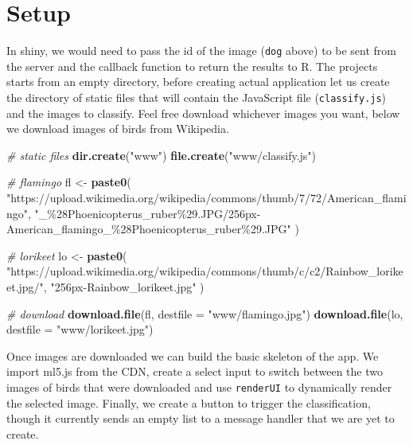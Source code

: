 \documentclass[
]{krantz}
\makeatletter
\newenvironment{Shaded}{\begin{snugshade}}{\end{snugshade}}
\newcommand{\CommentTok}[1]{\textcolor[rgb]{0.37,0.37,0.37}{\textit{#1}}}
\newcommand{\DataTypeTok}[1]{\textcolor[rgb]{0.27,0.27,0.27}{#1}}
\newcommand{\KeywordTok}[1]{\textcolor[rgb]{0.27,0.27,0.27}{\textbf{#1}}}
\newcommand{\NormalTok}[1]{#1}
\newcommand{\StringTok}[1]{\textcolor[rgb]{0.5,0.5,0.5}{#1}}
\newenvironment{kframe}{%
\medskip{}
\setlength{\fboxsep}{.8em}
 \def\at@end@of@kframe{}%
 \ifinner\ifhmode%
  \def\at@end@of@kframe{\end{minipage}}%
  \begin{minipage}{\columnwidth}%
 \fi\fi%
 \def\FrameCommand##1{\hskip\@totalleftmargin \hskip-\fboxsep
 \colorbox{shadecolor}{##1}\hskip-\fboxsep
     \hskip-\linewidth \hskip-\@totalleftmargin \hskip\columnwidth}%
 \MakeFramed {\advance\hsize-\width
   \@totalleftmargin\z@ \linewidth\hsize
   \@setminipage}}%
 {\par\unskip\endMakeFramed%
 \at@end@of@kframe}
\renewenvironment{Shaded}{\begin{kframe}}{\end{kframe}}
\makeatother
\begin{document}
\hypertarget{setup-1}{%
\section*{Setup}\label{setup-1}}


In shiny, we would need to pass the id of the image (\texttt{dog} above) to be sent from the server and the callback function to return the results to R. The projects starts from an empty directory, before creating actual application let us create the directory of static files that will contain the JavaScript file (\texttt{classify.js}) and the images to classify. Feel free download whichever images you want, below we download images of birds from Wikipedia.

\begin{Shaded}
\begin{Highlighting}[]
\CommentTok{\# static files}
\KeywordTok{dir.create}\NormalTok{(}\StringTok{"www"}\NormalTok{)}
\KeywordTok{file.create}\NormalTok{(}\StringTok{"www/classify.js"}\NormalTok{)}

\CommentTok{\# flamingo}
\NormalTok{fl \textless{}{-}}\StringTok{ }\KeywordTok{paste0}\NormalTok{(}
  \StringTok{"https://upload.wikimedia.org/wikipedia/commons/thumb/7/72/American\_flamingo"}\NormalTok{,}
  \StringTok{"\_\%28Phoenicopterus\_ruber\%29.JPG/256px{-}American\_flamingo\_\%28Phoenicopterus\_ruber\%29.JPG"}
\NormalTok{)}

\CommentTok{\# lorikeet}
\NormalTok{lo \textless{}{-}}\StringTok{ }\KeywordTok{paste0}\NormalTok{(}
  \StringTok{"https://upload.wikimedia.org/wikipedia/commons/thumb/c/c2/Rainbow\_lorikeet.jpg/"}\NormalTok{,}
  \StringTok{"256px{-}Rainbow\_lorikeet.jpg"}
\NormalTok{)}

\CommentTok{\# download}
\KeywordTok{download.file}\NormalTok{(fl, }\DataTypeTok{destfile =} \StringTok{"www/flamingo.jpg"}\NormalTok{)}
\KeywordTok{download.file}\NormalTok{(lo, }\DataTypeTok{destfile =} \StringTok{"www/lorikeet.jpg"}\NormalTok{)}
\end{Highlighting}
\end{Shaded}

Once images are downloaded we can build the basic skeleton of the app. We import ml5.js from the CDN, create a select input to switch between the two images of birds that were downloaded and use \texttt{renderUI} to dynamically render the selected image. Finally, we create a button to trigger the classification, though it currently sends an empty list to a message handler that we are yet to create.
\end{document}
